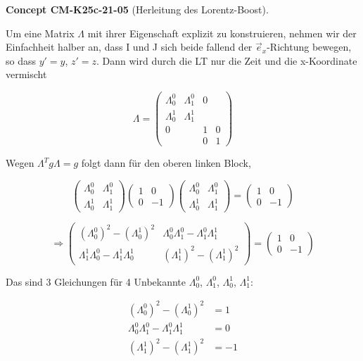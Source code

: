 \documentclass[10pt, letterpaper]{article}
\newcommand{\CustomHeading}[3]{%
  \par\medskip\noindent%
  \textbf{#1 #2} \textnormal{(#3)}.\enskip%
}
\newenvironment{CONC}[2]{\CustomHeading{Concept}{#1}{#2}}{}
\begin{document}
\begin{CONC}{CM-K25c-21-05}{Herleitung des Lorentz-Boost}
Um eine Matrix $\Lambda$ mit ihrer Eigenschaft explizit zu konstruieren, nehmen wir der Einfachheit halber an, dass I und J sich beide fallend der $\vec{e}_x$-Richtung bewegen, so dass $y'=y$, $z'=z$. Dann wird durch die LT nur die Zeit und die x-Koordinate vermischt

\[\Lambda = \begin{pmatrix}
\Lambda^0_0 & \Lambda^0_1 & 0 \\
\Lambda^1_0 & \Lambda^1_1 & \\
0 & & 1 & 0 \\
& & 0 & 1
\end{pmatrix}\]

Wegen $\Lambda^T g \Lambda = g$ folgt dann für den oberen linken Block,

\[\begin{pmatrix}
\Lambda^0_0 & \Lambda^0_1 \\
\Lambda^1_0 & \Lambda^1_1
\end{pmatrix}
\begin{pmatrix}
1 & 0 \\
0 & -1
\end{pmatrix}
\begin{pmatrix}
\Lambda^0_0 & \Lambda^0_1 \\
\Lambda^1_0 & \Lambda^1_1
\end{pmatrix} = 
\begin{pmatrix}
1 & 0 \\
0 & -1
\end{pmatrix}\]

\[\Rightarrow \begin{pmatrix}
(\Lambda^0_0)^2 - (\Lambda^1_0)^2 & \Lambda^0_0\Lambda^0_1 - \Lambda^0_1\Lambda^1_1 \\
\Lambda^1_1\Lambda^0_0 - \Lambda^1_1\Lambda^1_0 & (\Lambda^1_1)^2 - (\Lambda^1_1)^2
\end{pmatrix} = 
\begin{pmatrix}
1 & 0 \\
0 & -1
\end{pmatrix}\]

Das sind 3 Gleichungen für 4 Unbekannte $\Lambda^0_0$, $\Lambda^0_1$, $\Lambda^1_0$, $\Lambda^1_1$:

\begin{align*}
(\Lambda^0_0)^2 - (\Lambda^1_0)^2 &= 1 \tag{1} \\
\Lambda^0_0\Lambda^0_1-\Lambda^0_1\Lambda^1_1 &= 0 \tag{2} \\
(\Lambda^1_1)^2 - (\Lambda^1_1)^2 &= -1 \tag{3}
\end{align*}


\end{CONC}
\end{document}
